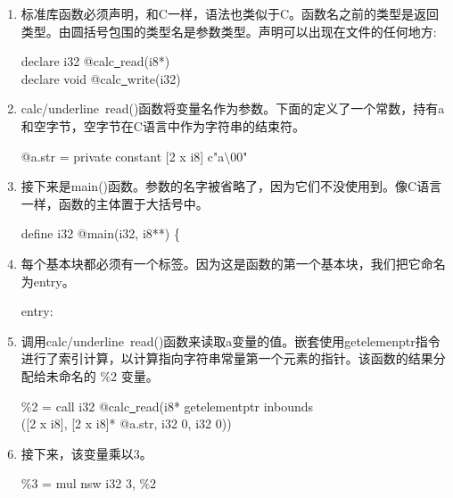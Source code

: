 \begin{enumerate}
\item 标准库函数必须声明，和C一样，语法也类似于C。函数名之前的类型是返回类型。由圆括号包围的类型名是参数类型。声明可以出现在文件的任何地方:
\begin{tcolorbox}[colback=white,colframe=black]
declare i32 @calc\underline{~}read(i8*) \\
declare void @calc\underline{~}write(i32)
\end{tcolorbox}

\item calc/underline{~}read()函数将变量名作为参数。下面的定义了一个常数，持有a和空字节，空字节在C语言中作为字符串的结束符。
\begin{tcolorbox}[colback=white,colframe=black]
@a.str = private constant [2 x i8] c"a$\setminus$00"
\end{tcolorbox}

\item 接下来是main()函数。参数的名字被省略了，因为它们不没使用到。像C语言一样，函数的主体置于大括号中。
\begin{tcolorbox}[colback=white,colframe=black]
define i32 @main(i32, i8**) \{
\end{tcolorbox}

\item 每个基本块都必须有一个标签。因为这是函数的第一个基本块，我们把它命名为entry。
\begin{tcolorbox}[colback=white,colframe=black]
entry:
\end{tcolorbox}

\item 调用calc/underline{~}read()函数来读取a变量的值。嵌套使用getelemenptr指令进行了索引计算，以计算指向字符串常量第一个元素的指针。该函数的结果分配给未命名的 \%2 变量。
\begin{tcolorbox}[colback=white,colframe=black]
\hspace*{1cm}\%2 = call i32 @calc\underline{~}read(i8* getelementptr inbounds \\
\hspace*{3.5cm}([2 x i8], [2 x i8]* @a.str, i32 0, i32
0))
\end{tcolorbox}

\item 接下来，该变量乘以3。
\begin{tcolorbox}[colback=white,colframe=black]
\hspace*{1cm}\%3 = mul nsw i32 3, \%2
\end{tcolorbox}


\end{enumerate}
